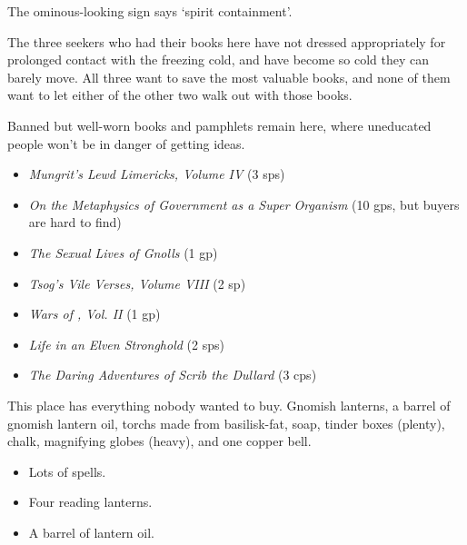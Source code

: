 \begin{multicols}{2}



The ominous-looking sign says `spirit containment'.



The three \glspl{seeker} who had their books here have not dressed appropriately for prolonged contact with the freezing cold, and have become so cold they can barely move.
All three want to save the most valuable books, and none of them want to let either of the other two walk out with those books.



Banned but well-worn books and pamphlets remain here, where uneducated people won't be in danger of getting ideas.

\begin{itemize}
  \item
  \textit{Mungrit's Lewd Limericks, Volume IV} (3 \glspl{sp})
  \item
  \textit{On the Metaphysics of Government as a Super Organism} (10 \glspl{gp}, but buyers are hard to find)
  \item
  \textit{The Sexual Lives of Gnolls} (1 \gls{gp})
  \item
  \textit{Tsog's Vile Verses, Volume VIII} (2 sp)
  \item
  \textit{Wars of , Vol. II} (1 \gls{gp})
  \item
  \textit{Life in an Elven Stronghold} (2 \glspl{sp})
  \item
  \textit{The Daring Adventures of Scrib the Dullard} (3 \glspl{cp})
\end{itemize}


This place has everything nobody wanted to buy.
Gnomish lanterns, a barrel of gnomish lantern oil, \glspl{torch} made from \gls{basilisk}-fat, soap, tinder boxes (plenty), chalk, magnifying globes (heavy), and one copper bell.



\begin{itemize}
  \item
  Lots of \glspl{spell}.
  \item
  Four reading lanterns.
  \item
  A barrel of lantern oil.
\end{itemize}



\end{multicols}
